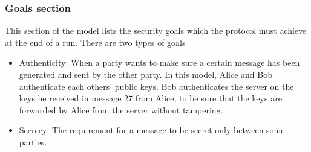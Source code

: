 \subsubsection{Goals section}
This section of the model lists the security goals which the protocol must achieve at the end of a run. There are two types of goals
\begin{itemize}\setlength\itemsep{-0.3em}
	\item Authenticity: When a party wants to make sure a certain message has been generated and sent by the other party. In this model, Alice and Bob authenticate each others' public keys. Bob authenticates the server on the keys he received in message 27 from Alice, to be sure that the keys are forwarded by Alice from the server without tampering.
	\item Secrecy: The requirement for a message to be secret only between some parties.
\end{itemize}



